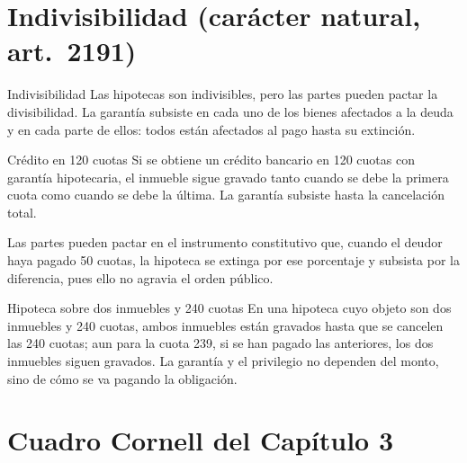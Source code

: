 \documentclass[12pt,oneside]{book}
\begin{document}
\section{Indivisibilidad (carácter natural, art.~2191)}

\begin{definition}{Indivisibilidad}
Las hipotecas son indivisibles, pero las partes pueden pactar la divisibilidad. La garantía subsiste en cada uno de los bienes afectados a la deuda y en cada parte de ellos: todos están afectados al pago hasta su extinción.
\end{definition}

\begin{example}{Crédito en 120 cuotas}
Si se obtiene un crédito bancario en 120 cuotas con garantía hipotecaria, el inmueble sigue gravado tanto cuando se debe la primera cuota como cuando se debe la última. La garantía subsiste hasta la cancelación total.
\end{example}

Las partes pueden pactar en el instrumento constitutivo que, cuando el deudor haya pagado 50 cuotas, la hipoteca se extinga por ese porcentaje y subsista por la diferencia, pues ello no agravia el orden público.

\begin{example}{Hipoteca sobre dos inmuebles y 240 cuotas}
En una hipoteca cuyo objeto son dos inmuebles y 240 cuotas, ambos inmuebles están gravados hasta que se cancelen las 240 cuotas; aun para la cuota 239, si se han pagado las anteriores, los dos inmuebles siguen gravados. La garantía y el privilegio no dependen del monto, sino de cómo se va pagando la obligación.
\end{example}

\section{Cuadro Cornell del Capítulo 3}
\end{document}
